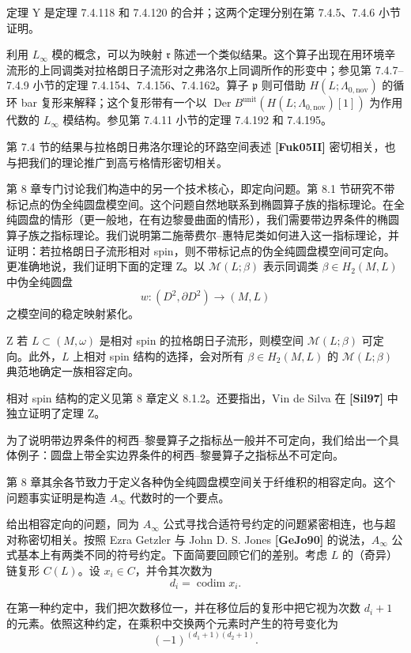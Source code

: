 定理 Y 是定理 7.4.118 和 7.4.120 的合并；这两个定理分别在第 7.4.5、7.4.6 小节证明。

利用 $L_\infty$ 模的概念，可以为映射 $\mathfrak r$ 陈述一个类似结果。这个算子出现在用环境辛流形的上同调类对拉格朗日子流形对之弗洛尔上同调所作的形变中；参见第 7.4.7--7.4.9 小节的定理 7.4.154、7.4.156、7.4.162。算子 $\mathfrak p$ 则可借助 $H(L;\Lambda_{0,\mathrm{nov}})$ 的循环 bar 复形来解释；这个复形带有一个以 $\operatorname{Der}B^{\mathrm{unit}}(H(L;\Lambda_{0,\mathrm{nov}})[1])$ 为作用代数的 $L_\infty$ 模结构。参见第 7.4.11 小节的定理 7.4.192 和 7.4.195。

第 7.4 节的结果与拉格朗日弗洛尔理论的环路空间表述 \textbf{[Fuk05II]} 密切相关，也与把我们的理论推广到高亏格情形密切相关。

第 8 章专门讨论我们构造中的另一个技术核心，即定向问题。第 8.1 节研究不带标记点的伪全纯圆盘模空间。这个问题自然地联系到椭圆算子族的指标理论。在全纯圆盘的情形（更一般地，在有边黎曼曲面的情形），我们需要带边界条件的椭圆算子族之指标理论。我们说明第二施蒂费尔--惠特尼类如何进入这一指标理论，并证明：若拉格朗日子流形相对 spin，则不带标记点的伪全纯圆盘模空间可定向。更准确地说，我们证明下面的定理 Z。以 $\mathcal M(L;\beta)$ 表示同调类 $\beta\in H_2(M,L)$ 中伪全纯圆盘
\[
  w\colon(D^2,\partial D^2)\longrightarrow(M,L)
\]
之模空间的稳定映射紧化。

\begin{theorem}{Z}\label{thm:intro-Z}
若 $L\subset(M,\omega)$ 是相对 spin 的拉格朗日子流形，则模空间 $\mathcal M(L;\beta)$ 可定向。此外，$L$ 上相对 spin 结构的选择，会对所有 $\beta\in H_2(M,L)$ 的 $\mathcal M(L;\beta)$ 典范地确定一族相容定向。
\end{theorem}

相对 spin 结构的定义见第 8 章定义 8.1.2。还要指出，Vin de Silva 在 \textbf{[Sil97]} 中独立证明了定理 Z。

为了说明带边界条件的柯西--黎曼算子之指标丛一般并不可定向，我们给出一个具体例子：圆盘上带全实边界条件的柯西--黎曼算子之指标丛不可定向。

第 8 章其余各节致力于定义各种伪全纯圆盘模空间关于纤维积的相容定向。这个问题事实证明是构造 $A_\infty$ 代数时的一个要点。

给出相容定向的问题，同为 $A_\infty$ 公式寻找合适符号约定的问题紧密相连，也与超对称密切相关。按照 Ezra Getzler 与 John D. S. Jones \textbf{[GeJo90]} 的说法，$A_\infty$ 公式基本上有两类不同的符号约定。下面简要回顾它们的差别。考虑 $L$ 的（奇异）链复形 $C(L)$。设 $x_i\in C$，并令其次数为
\[
  d_i=\operatorname{codim}x_i.
\]

在第一种约定中，我们把次数移位一，并在移位后的复形中把它视为次数 $d_i+1$ 的元素。依照这种约定，在乘积中交换两个元素时产生的符号变化为
\[
  (-1)^{(d_1+1)(d_2+1)}.
\]

